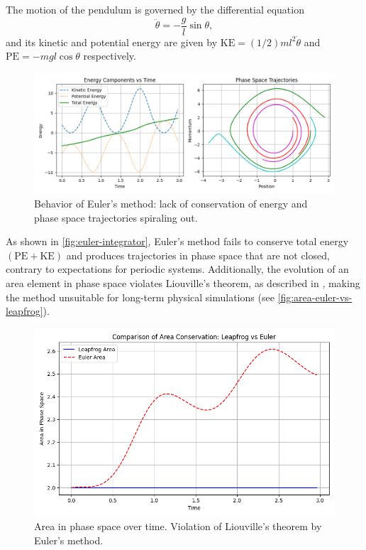 The motion of the pendulum is governed by the differential equation
\begin{equation*}
    \ddot{\theta} = -\frac{g}{l}\sin\theta,
\end{equation*}
and its kinetic and potential energy are given by $\textrm{KE} = (1/2)ml^2\dot{\theta}$ and $\textrm{PE} = -mgl\cos\theta$ respectively.
\begin{figure}[htp]
    \centering
    \includegraphics[scale=0.6]{img/integrators/euler-pendulum.png}
    \caption{Behavior of Euler's method: lack of conservation of energy and phase space trajectories spiraling out.}
    \label{fig:euler-integrator}
\end{figure}
As shown in \autoref{fig:euler-integrator}, Euler's method fails to conserve total energy $(\textrm{PE} + \textrm{KE})$ and produces trajectories in phase space that are not closed, contrary to expectations for periodic systems.
Additionally, the evolution of an area element in phase space violates Liouville's theorem, as described in \cite{taylor2005classical}, making the method unsuitable for long-term physical simulations (see \autoref{fig:area-euler-vs-leapfrog}).
\begin{figure}[htp]
    \centering
    \includegraphics[scale=0.4]{img/integrators/area-leap-vs-euler.png}
    \caption{Area in phase space over time. Violation of Liouville's theorem by Euler's method.}
    \label{fig:area-euler-vs-leapfrog}
\end{figure}

